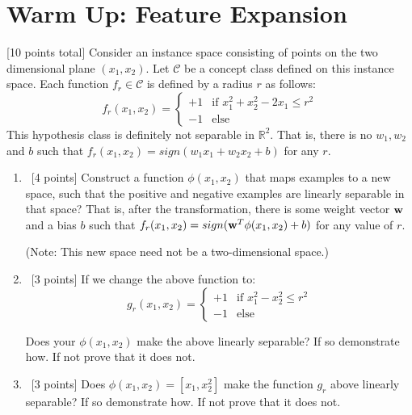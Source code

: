 \section{Warm Up: Feature Expansion}
\label{sec:feature-expansion}

[10 points total] Consider an instance space consisting of points on
the two dimensional plane $(x_1,x_2)$. Let $\mathcal{C}$ be a concept
class defined on this instance space. Each function
$f_r \in \mathcal{C}$ is defined by a radius $r$ as follows:
\[
f_r(x_1, x_2) = 
\begin{cases}
  +1  & \text{if } x_1^2 +x_2^2 - 2x_1 \leq r^2 \\
  -1 & \text{else}
\end{cases}
\]
This hypothesis class is definitely not separable in $\mathbb{R}^2$.
That is, there is no $w_1, w_2$ and $b$ such that $f_r(x_1, x_2) =
sign(w_1 x_1 + w_2 x_2 + b)$ for any $r$. 

\begin{enumerate}
\item ~[4 points] Construct a function $\phi(x_1,x_2)$ that maps
  examples to a new space, such that the positive and negative
  examples are linearly separable in that space? That is, after the
  transformation, there is some weight vector ${\bf w}$ and a bias $b$
  such that $f_r(x_1, x_2) = sign({\bf w}^T\phi(x_1, x_2) + b)$ for any
  value of $r$.

  (Note: This new space need not be a two-dimensional space.)

\item ~[3 points] If we change the above function to: 
  \[
  g_r(x_1,x_2) = 
  \begin{cases}
    +1 & \text{if } x_1^2 -x_2^2 \leq r^2 \\
    -1 & \text{else}
  \end{cases}
  \]

  Does your $\phi(x_1,x_2)$ make the above linearly separable?  If so
  demonstrate how. If not prove that it does not.

\item ~[3 points] Does $\phi(x_1,x_2) = [x_1,x_2^2]$ make the function
  $g_r$ above linearly separable? If so demonstrate how. If not prove
  that it does not.

\end{enumerate}



